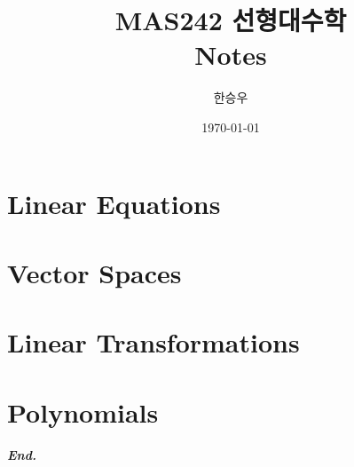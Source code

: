 \documentclass[a4paper,12pt]{report}
\title{\Huge{MAS242 선형대수학\\Notes}}
\author{\huge{한승우}}
\date{\today}
\begin{document}
\maketitle
\newpage
{}
\tikzexternaldisable
\tableofcontents
\tikzexternalenable
\pagebreak

\chapter{Linear Equations}

\chapter{Vector Spaces}
 
\chapter{Linear Transformations}
 
\chapter{Polynomials}
 
\vfill
\begin{center}
    \textbf{\textit{End.}}
\end{center}
\end{document}
